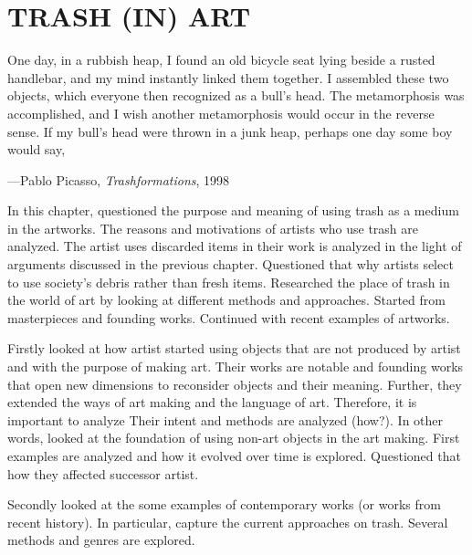 \chapter{TRASH (IN) ART}




\begin{singlespace}
\epigraph{One day, in a rubbish heap, I found an old bicycle seat lying beside a rusted handlebar, and my mind instantly linked them together. I assembled these two objects, which everyone then recognized as a bull’s head. The metamorphosis was accomplished, and I wish another metamorphosis would occur in the reverse sense. If my bull’s head were thrown in a junk heap, perhaps one day some boy would say, }{\hfill ---Pablo Picasso, \textit{Trashformations}, 1998}
\end{singlespace}





In this chapter, questioned the purpose and meaning of using trash as a medium in the artworks. The reasons and motivations of artists who use trash are analyzed. The artist uses discarded items in their work is analyzed in the light of arguments discussed in the previous chapter. Questioned that why artists select to use society's debris rather than fresh items. Researched the place of trash in the world of art by looking at different methods and approaches. Started from masterpieces and founding works. Continued with recent examples of artworks.  



Firstly looked at how artist started using objects that are not produced by artist and with the purpose of making art. Their works are notable and founding works that open new dimensions to reconsider objects and their meaning. Further, they extended the ways of art making and the language of art. Therefore, it is important to analyze Their intent and methods are analyzed (how?). In other words, looked at the foundation of using non-art objects in the art making. First examples are analyzed and how it evolved over time is explored. Questioned that how they affected successor artist.

Secondly looked at the some examples of contemporary works (or works from recent history). In particular, capture the current approaches on trash. Several methods and genres are explored. 

